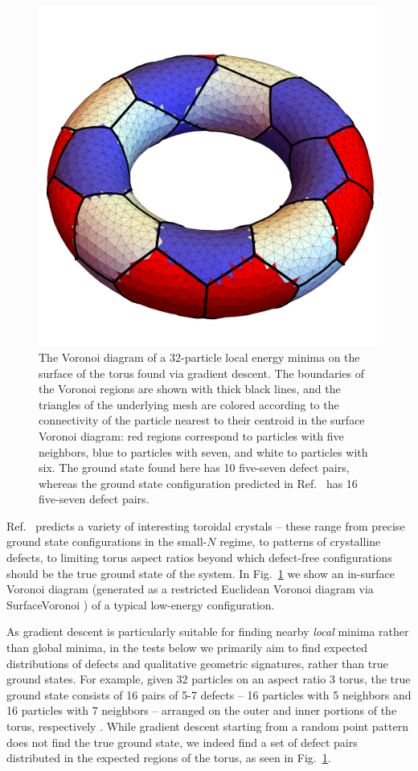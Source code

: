 \documentclass[preprint,12pt]{elsarticle}
\newcounter{bla}
\begin{document}
\begin{figure}[b!]
\centering
\includegraphics[width=0.75\columnwidth]{32_particle_voronoi_regions.pdf}
\caption{The Voronoi diagram of a 32-particle local energy minima on the surface of the torus found via gradient descent. The boundaries of the Voronoi regions are shown with thick black lines, and the triangles of the underlying mesh are colored according to the connectivity of the particle nearest to their centroid in the surface Voronoi diagram: red regions correspond to particles with five neighbors, blue to particles with seven, and white to particles with six. The ground state found here has 10 five-seven defect pairs, whereas the ground state configuration predicted in Ref.~\cite{giomi2008elastic} has 16 five-seven defect pairs.}
\label{fig:smallTorusSmallNConfiguration}
\end{figure}

Ref.~\cite{giomi2008elastic} predicts a variety of interesting toroidal crystals -- these range from precise ground state configurations in the small-$N$ regime, to patterns of crystalline defects, to limiting torus aspect ratios beyond which defect-free configurations should be the true ground state of the system. In Fig.~\ref{fig:smallTorusSmallNConfiguration} we show an in-surface Voronoi diagram (generated as a restricted Euclidean Voronoi diagram via SurfaceVoronoi \cite{xin2022surfacevoronoi}) of a typical low-energy configuration. 

As gradient descent is particularly suitable for finding nearby \emph{local} minima rather than global minima, in the tests below we primarily aim to find expected distributions of defects and qualitative geometric signatures, rather than true ground states. For example, given 32 particles on an aspect ratio 3 torus, the true ground state consists of 16 pairs of 5-7 defects -- 16 particles with 5 neighbors and 16 particles with 7 neighbors -- arranged on the outer and inner portions of the torus, respectively \cite{giomi2008elastic}. While gradient descent starting from a random point pattern does not find the true ground state, we indeed find a set of defect pairs distributed in the expected regions of the torus, as seen in  Fig.~\ref{fig:smallTorusSmallNConfiguration}. 
\end{document}
